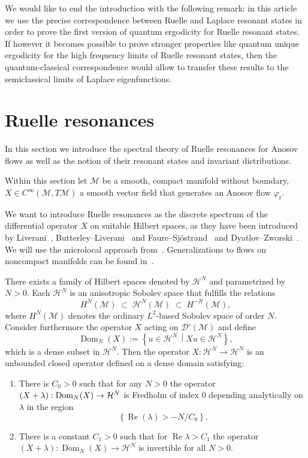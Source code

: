 \documentclass[AHL, Unicode, longabstracts, published]{cedram}
\DeclareMathOperator{\Real}{Re}
\DeclareMathOperator{\Dom}{Dom}
\newcommand{\mc}{\mathcal}
\let\Re=\Real
\renewcommand{\Re}{\operatorname{Re}}
\begin{document}
We would like to end the introduction with the following remark: in this article we use the precise correspondence between Ruelle and Laplace resonant states in order to prove the first version of quantum ergodicity for Ruelle resonant states. If however it becomes possible to prove stronger properties like quantum unique ergodicity for the high frequency limits of Ruelle resonant states, then the quantum-classical correspondence would allow to transfer these results to the semiclassical limits of Laplace eigenfunctions.

\section{Ruelle resonances}\label{sec:PRR}
In this section we introduce the spectral theory of Ruelle resonances for Anosov flows as well as the notion of their resonant states and invariant distributions.

Within this section let $\mathcal M$ be a smooth, compact manifold without boundary, $X\in C^\infty(\mathcal M,T\mathcal M)$ a smooth vector field that generates an Anosov flow $\varphi_t$.

We want to introduce Ruelle resonances as the discrete spectrum of the differential operator $X$ on suitable Hilbert spaces, as they have been introduced by Liverani~\cite{Liv04}, Butterley--Liverani~\cite{BL07} and Faure--Sj\"ostrand~\cite{FSj11} and Dyatlov--Zworski~\cite{DZ16}. We will use the microlocal approach from~\cite{DZ16,FSj11}. Generalizations to flows on noncompact manifolds can be found in~\cite{DG16, BW17}.

\begin{prop}\label{thm:fredholm_property}
There exists a family of Hilbert spaces denoted by $\mc{H}^N$ and parametrized by $N>0$. Each $\mc{H}^N$ is an anisotropic Sobolev space that fulfills the relations
\[
H^N(\mc{M})\;\subset\;\mc{H}^N(\mathcal M)\;\subset\; H^{-N}(\mathcal M),
\]
where $H^N(\mathcal M)$ denotes the ordinary $L^2$-based Sobolev space of order $N$. Consider furthermore the operator $X$ acting on $\mathcal D'(\mathcal M)$ and define
\[
{\Dom}_{N}(X):=\left\{u\in \mc{H}^N\,\middle| X u\in \mc{H}^N\right\},
\]
which is a dense subset in $\mc{H}^N$. Then the operator $X: \mc{H}^N\to \mc{H}^N$ is an unbounded closed operator defined on a dense domain satisfying:
\begin{enumerate}
\item \label{list2.1.1}There is $C_0>0$ such that for any $N>0$ the operator $(X+\lambda):{\Dom}_{N}(X)\linebreak\to \mc{H}^N$ is Fredholm of index $0$ depending analytically on $\lambda$ in the region
\[
\left\{\Real(\lambda) >-N/C_0
\right\}.
\]
\item \label{list2.1.2}There is a constant $C_1>0$ such that for $\Re\lambda>C_1$ the operator $(X+\lambda):{\Dom}_{N}(X)\to \mc{H}^N$ is invertible for all $N>0$.
\end{enumerate}
\end{prop}
\end{document}
